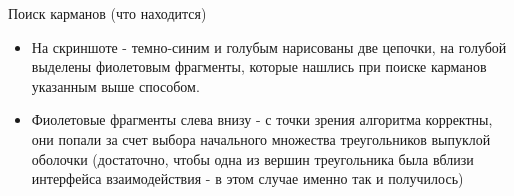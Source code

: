 \documentclass[10pt, xcolor={dvipsnames}]{beamer}
\begin{document}
\begin{frame}{Поиск карманов (что находится) }
\begin{itemize}
\item На скриншоте - темно-синим и голубым нарисованы две цепочки, на голубой выделены фиолетовым фрагменты, которые нашлись при поиске карманов указанным выше способом.
\item Фиолетовые фрагменты слева внизу - с точки зрения алгоритма корректны, они попали за счет выбора начального множества треугольников выпуклой оболочки (достаточно, чтобы одна из вершин треугольника была вблизи интерфейса взаимодействия - в этом случае именно так и получилось)
\end{itemize}
\begin{center}
\end{center}
\end{frame}
\end{document}
